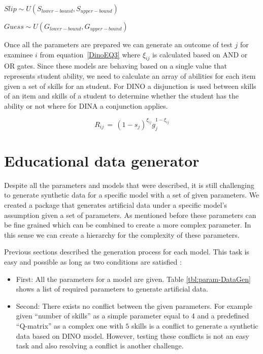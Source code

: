 \begin{center}
$Slip \sim \textit{U}(S_{lower-bound}, S_{upper-bound})$

$Guess \sim \textit{U}(G_{lower-bound}, G_{upper-bound})$
\end{center}

Once all the parameters are prepared we can generate an outcome of test $j$ for examinee $i$ from equation~\ref{DinoEQ3} where $\xi_{ij}$ is calculated based on AND or OR gates. Since these models are behaving based on a single value that represents student ability, we need to calculate an array of abilities for each item given a set of skills for an student. For DINO a disjunction is used between skills of an item and skills of a student to determine whether the student has the ability or not where for DINA a conjunction applies.

\begin{equation}
 R_{ij} \,=\, (1-s_j)^{\xi_{ij}} g_j^{1-\xi_{ij}}
\label{DinoEQ3}
\end{equation}

\section{Educational data generator}

Despite all the parameters and models that were described, it is still challenging to generate synthetic data for a specific model with a set of given parameters. We \citep{Trieu2015} created a package that generates artificial data under a specific model's assumption given a set of parameters. As mentioned before these parameters can be fine grained which can be combined to create a more complex parameter. In this sense we can create a hierarchy for the complexity of these parameters. 

Previous sections described the generation process for each model. This task is easy and possible as long as two conditions are satisfied : 
\begin{itemize}
\item First: All the parameters for a model are given. Table \ref{tbl:param-DataGen} shows a list of required parameters to generate artificial data.
\item Second: There exists no conflict between the given parameters. For example given ``number of skills'' as a simple parameter equal to $4$ and a predefined ``Q-matrix'' as a complex one with $5$ skills is a conflict to generate a synthetic data based on DINO model. However, testing these conflicts is not an easy task and also resolving a conflict is another challenge.
\end{itemize} 

